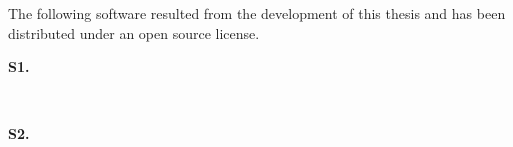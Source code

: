 The following software resulted from the development of this thesis and has been
distributed under an open source license.

\begin{description}
  \item[\textbf{S1.}]~~\cite{rodriguesnasf4niopy}

  \item[\textbf{S2.}]~~\cite{rodrigueshascodemodels}
\end{description}